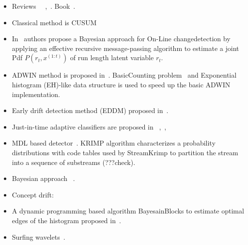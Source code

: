 \begin{itemize}
    
    \item Reviews~\cite{Polunchenko2011}
    ~\cite{WilsonBayesOnline},~\cite{TartakovskySeq}. Book~\cite{basseville1993detection}.
    
	\item Classical method is CUSUM~\cite{Page1954}
	
	\item In~\cite{mackay2007} authors propose a Bayesian approach for On-Line changedetection by applying an effective recursive message-passing algorithm to estimate a joint Pdf $P(r_t, x^{(1:t)})$ of run length latent variable $r_t$.
	
	\item ADWIN method is proposed in~\cite{bifet2007learning}. 
    BasicCounting problem~\cite{datar2002} and Exponential histogram (EH)-like data structure is used to speed up the basic ADWIN implementation.
	
	\item Early drift detection method (EDDM) proposed in~\cite{baena2006early}.
	
	\item Just-in-time adaptive classifiers are proposed in ~\cite{alippi2008just},~\cite{alippi2008just2},~\cite{AlippiRecConcept}
	
	\item MDL based detector~\cite{StreamKrimp}. KRIMP algorithm characterizes a probability distributions with code tables used by StreamKrimp to partition the stream into a sequence of substreams (???check).
    
    \item Bayesian approach
    ~\cite{fearnhead2003line}.
    
    \item Concept drift: ~\cite{Widmer1996}
    
    \item A dynamic programming based algorithm BayesainBlocks to estimate optimal edges of the histogram proposed in~\cite{scargle2013studies}.
    
    \item Surfing wavelets~\cite{gilbert2001surfing}.
    
\end{itemize}



